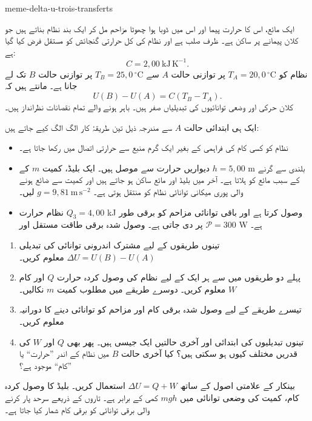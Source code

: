 \begin{exo}{meme-delta-u-trois-transferts}

ایک مائع، اس کا حرارت پیما اور اس میں ڈوبا ہوا چھوٹا مزاحم مل کر ایک بند نظام
بناتے ہیں جو کلان پیمانے پر ساکن ہے۔ ظرف صلب ہے اور نظام کی کل حرارتی گنجائش
کو مستقل فرض کیا گیا ہے:
\[
C=2{,}00\ \mathrm{kJ\,K^{-1}}.
\]
نظام کو $T_A=20{,}0\,^\circ\mathrm{C}$ پر توازنی حالت $A$ سے
$T_B=25{,}0\,^\circ\mathrm{C}$ پر توازنی حالت $B$ تک لے جانا ہے۔ مانتے ہیں کہ
\[
U(B)-U(A)=C(T_B-T_A).
\]
کلان حرکی اور وضعی توانائیوں کی تبدیلیاں صفر ہیں۔ باہر ہونے والے تمام نقصانات نظرانداز ہیں۔

ایک ہی ابتدائی حالت $A$ سے مندرجہ ذیل تین طریقۂ کار الگ الگ کیے جاتے ہیں:
\begin{itemize}
\item[طریقۂ کار 1] نظام کو کسی کام کی فراہمی کے بغیر ایک گرم منبع سے حرارتی اتصال میں رکھا جاتا ہے۔
\item[طریقۂ کار 2] دیواریں حرارت سے موصل ہیں۔ ایک بلیڈ، کمیت $m$ کے $h=5{,}00$ m بلندی سے گرنے کے سبب مائع کو ہلاتا ہے۔ آخر میں بلیڈ اور مائع ساکن ہو جاتے ہیں اور کمیت سے ضائع ہونے والی پوری میکانی توانائی نظام کو منتقل ہوتی ہے۔ $g=9{,}81\ \mathrm{m\,s^{-2}}$ لیں۔
\item[طریقۂ کار 3] نظام حرارت $Q_3=4{,}00$ kJ وصول کرتا ہے اور باقی توانائی مزاحم کو برقی طور پر دی جاتی ہے۔ وصول شدہ برقی طاقت مستقل اور $\mathcal P=300$ W ہے۔
\end{itemize}

\begin{enumerate}
\item تینوں طریقوں کے لیے مشترک اندرونی توانائی کی تبدیلی $\Delta U=U(B)-U(A)$ معلوم کریں۔
\item پہلے دو طریقوں میں سے ہر ایک کے لیے نظام کی وصول کردہ حرارت $Q$ اور کام $W$ معلوم کریں۔ دوسرے طریقے میں مطلوب کمیت $m$ نکالیں۔
\item تیسرے طریقے کے لیے وصول شدہ برقی کام اور مزاحم کو توانائی دینے کا دورانیہ معلوم کریں۔
\item تینوں تبدیلیوں کی ابتدائی اور آخری حالتیں ایک جیسی ہیں۔ پھر بھی $Q$ اور $W$ کی قدریں مختلف کیوں ہو سکتی ہیں؟ کیا آخری حالت $B$ میں نظام کے اندر ”حرارت“ یا ”کام“ موجود ہے؟
\end{enumerate}

\begin{indication}
بینکار کے علامتی اصول کے ساتھ $\Delta U=Q+W$ استعمال کریں۔ بلیڈ کا وصول کردہ
کام، کمیت کی وضعی توانائی میں $mgh$ کمی کے برابر ہے۔ تاروں کے ذریعے سرحد پار
کرنے والی برقی توانائی کو برقی کام شمار کیا جاتا ہے۔
\end{indication}


\end{exo}
